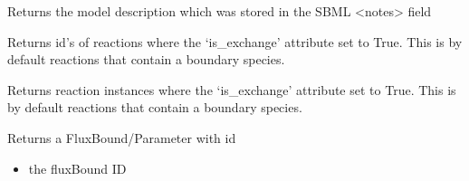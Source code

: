 \documentclass[letterpaper,10pt,english]{sphinxmanual}
\begin{document}
\begin{fulllineitems}
\begin{fulllineitems}
\begin{itemize}
\end{itemize}

\end{fulllineitems}


\begin{fulllineitems}
\label{\detokenize{modules_doc:cbmpy.CBModel.Model.getDescription}}
\pysigstartsignatures
{}
\pysigstopsignatures
\sphinxAtStartPar
Returns the model description which was stored in the SBML \textless{}notes\textgreater{} field

\end{fulllineitems}


\begin{fulllineitems}
\label{\detokenize{modules_doc:cbmpy.CBModel.Model.getExchangeReactionIds}}
\pysigstartsignatures
{}
\pysigstopsignatures
\sphinxAtStartPar
Returns id’s of reactions where the ‘is\_exchange’ attribute set to True. This is by default
reactions that contain a boundary species.

\end{fulllineitems}


\begin{fulllineitems}
\label{\detokenize{modules_doc:cbmpy.CBModel.Model.getExchangeReactions}}
\pysigstartsignatures
{}
\pysigstopsignatures
\sphinxAtStartPar
Returns reaction instances where the ‘is\_exchange’ attribute set to True. This is by default
reactions that contain a boundary species.

\end{fulllineitems}


\begin{fulllineitems}
\label{\detokenize{modules_doc:cbmpy.CBModel.Model.getFluxBoundByID}}
\pysigstartsignatures
{}
\pysigstopsignatures
\sphinxAtStartPar
Returns a FluxBound/Parameter with id
\begin{itemize}
\item {} 
\sphinxAtStartPar
{} the fluxBound ID


\end{itemize}
\end{fulllineitems}
\end{fulllineitems}
\end{document}
